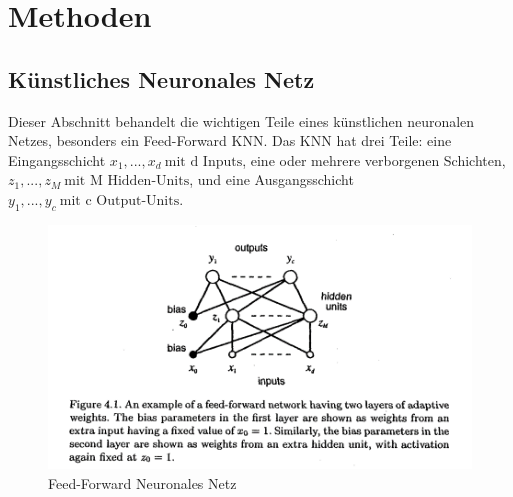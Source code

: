 \documentclass[12pt]{article}
\begin{document}
    \newpage \section{Methoden}

        \subsection{Künstliches Neuronales Netz}

            Dieser Abschnitt behandelt die wichtigen Teile eines künstlichen neuronalen Netzes, 
            besonders ein Feed-Forward KNN. Das KNN hat drei Teile: 
            eine Eingangsschicht \( x_1, ..., x_d \ \textrm{mit d Inputs} \),
            eine oder mehrere verborgenen Schichten, \( z_1, ..., z_M \ \textrm{mit M Hidden-Units} \),
            und eine Ausgangsschicht \( y_1, ..., y_c \ \textrm{mit c Output-Units} \).
            
            \begin{figure}[htp]
            
                \begin{center}

                    \includegraphics[scale=1]{neuronales-netz-bishop.png}
                    \caption{Feed-Forward Neuronales Netz \cite{bishop1995}}
        
                \end{center}
                
            \end{figure}
        
\end{document}
